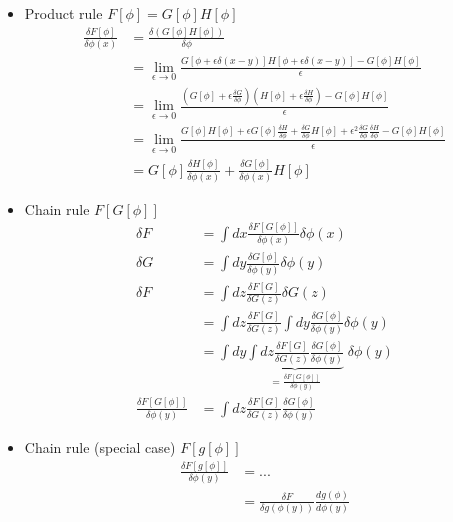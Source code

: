 \documentclass[10pt,a4paper]{book}
\theoremstyle{definition}
\begin{document}
\begin{itemize}
    \item Product rule $F[\phi]=G[\phi]H[\phi]$
    \begin{align}
        \frac{\delta F[\phi]}{\delta\phi(x)}
        &=\frac{\delta(G[\phi]H[\phi])}{\delta\phi}\\
        &=\lim_{\epsilon\rightarrow0}\frac{G[\phi+\epsilon\delta(x-y)]H[\phi+\epsilon\delta(x-y)]-G[\phi]H[\phi]}{\epsilon}\\
        &=\lim_{\epsilon\rightarrow0}\frac{\left(G[\phi]+\epsilon\frac{\delta G}{\delta\phi}\right)\left(H[\phi]+\epsilon\frac{\delta H}{\delta\phi}\right)-G[\phi]H[\phi]}{\epsilon}\\
        &=\lim_{\epsilon\rightarrow0}\frac{G[\phi]H[\phi]+\epsilon G[\phi]\frac{\delta H}{\delta\phi}+\frac{\delta G}{\delta\phi}H[\phi]+\epsilon^2\frac{\delta G}{\delta\phi}\frac{\delta H}{\delta\phi}-G[\phi]H[\phi]}{\epsilon}\\
        &=G[\phi]\frac{\delta H[\phi]}{\delta\phi(x)}+\frac{\delta G[\phi]}{\delta\phi(x)}H[\phi]
    \end{align}
    \item Chain rule $F[G[\phi]]$
    \begin{align}
        \delta F
        &=\int dx \frac{\delta F[G[\phi]]}{\delta\phi(x)} \delta\phi(x)\\
        \delta G
        &=\int dy \frac{\delta G[\phi]}{\delta\phi(y)} \delta\phi(y)\\
        \delta F
        &=\int dz \frac{\delta F[G]}{\delta G(z)} \delta G(z)\\
        &=\int dz \frac{\delta F[G]}{\delta G(z)} \int dy \frac{\delta G[\phi]}{\delta\phi(y)} \delta\phi(y) \\
        &=\int dy \underbrace{\int dz \frac{\delta F[G]}{\delta G(z)} \frac{\delta G[\phi]}{\delta\phi(y)}}_{=\frac{\delta F[G[\phi]]}{\delta\phi(y)}} \;\delta\phi(y) \\
        \frac{\delta F[G[\phi]]}{\delta\phi(y)}
        &=\int dz \frac{\delta F[G]}{\delta G(z)} \frac{\delta G[\phi]}{\delta\phi(y)}
    \end{align}
    \item Chain rule (special case) $F[g[\phi]]$
    \begin{align}
        \frac{\delta F[g[\phi]]}{\delta\phi(y)}
        &=...\\
        &=\frac{\delta F}{\delta g(\phi(y))} \frac{d g(\phi)}{d\phi(y)}
    \end{align}
\end{itemize}
\end{document}
